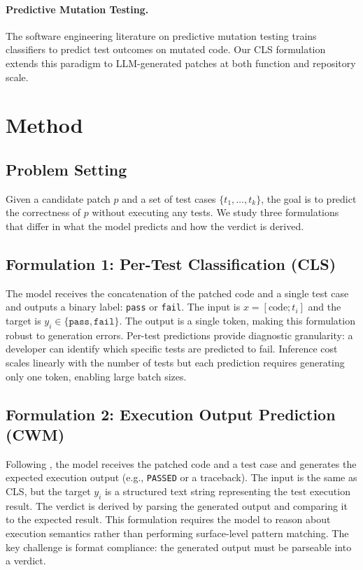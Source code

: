 \documentclass[11pt,a4paper]{article}
\begin{document}
\paragraph{Predictive Mutation Testing.}
The software engineering literature on predictive mutation testing \citep{zhang2018predictive} trains classifiers to predict test outcomes on mutated code.
Our CLS formulation extends this paradigm to LLM-generated patches at both function and repository scale.

\section{Method}
\label{sec:method}

\subsection{Problem Setting}

Given a candidate patch $p$ and a set of test cases $\{t_1, \ldots, t_k\}$, the goal is to predict the correctness of $p$ without executing any tests.
We study three formulations that differ in what the model predicts and how the verdict is derived.

\subsection{Formulation 1: Per-Test Classification (CLS)}

The model receives the concatenation of the patched code and a single test case and outputs a binary label: \texttt{pass} or \texttt{fail}.
The input is $x = [\text{code}; t_i]$ and the target is $y_i \in \{\texttt{pass}, \texttt{fail}\}$.
The output is a single token, making this formulation robust to generation errors.
Per-test predictions provide diagnostic granularity: a developer can identify which specific tests are predicted to fail.
Inference cost scales linearly with the number of tests but each prediction requires generating only one token, enabling large batch sizes.

\subsection{Formulation 2: Execution Output Prediction (CWM)}

Following \citet{gu2024cwm}, the model receives the patched code and a test case and generates the expected execution output (e.g., \texttt{PASSED} or a traceback).
The input is the same as CLS, but the target $y_i$ is a structured text string representing the test execution result.
The verdict is derived by parsing the generated output and comparing it to the expected result.
This formulation requires the model to reason about execution semantics rather than performing surface-level pattern matching.
The key challenge is format compliance: the generated output must be parseable into a verdict.
\end{document}
